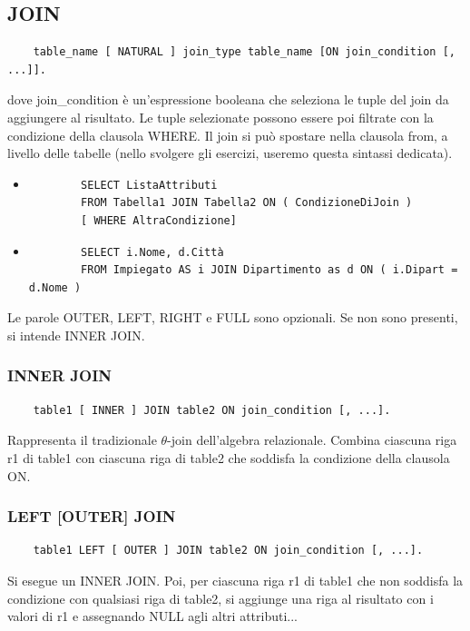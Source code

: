 \documentclass[a4paper]{article}
\begin{document}
\subsection{JOIN}

\begin{verbatim}
    table_name [ NATURAL ] join_type table_name [ON join_condition [, ...]].
\end{verbatim}
\noindent
dove join\_condition è un’espressione booleana che
seleziona le tuple del join da aggiungere al risultato. Le
tuple selezionate possono essere poi filtrate con la
condizione della clausola WHERE.
Il join si può spostare nella clausola from, a livello delle tabelle (nello
svolgere gli esercizi, useremo questa sintassi dedicata).

\begin{itemize}
    \item \begin{verbatim}
        SELECT ListaAttributi
        FROM Tabella1 JOIN Tabella2 ON ( CondizioneDiJoin )
        [ WHERE AltraCondizione]
    \end{verbatim}
    \item \begin{verbatim}
        SELECT i.Nome, d.Città
        FROM Impiegato AS i JOIN Dipartimento as d ON ( i.Dipart = d.Nome )
    \end{verbatim}
\end{itemize}
\noindent
Le parole OUTER, LEFT, RIGHT e FULL sono opzionali. Se non sono presenti, si intende INNER JOIN.

\subsubsection{INNER JOIN}

\begin{verbatim}
    table1 [ INNER ] JOIN table2 ON join_condition [, ...].
\end{verbatim}
\noindent
Rappresenta il tradizionale $\theta$-join dell’algebra relazionale.
Combina ciascuna riga r1 di table1 con ciascuna riga di
table2 che soddisfa la condizione della clausola ON.

\subsubsection{LEFT [OUTER] JOIN}

\begin{verbatim}
    table1 LEFT [ OUTER ] JOIN table2 ON join_condition [, ...].
\end{verbatim}
\noindent
Si esegue un INNER JOIN. Poi, per ciascuna riga r1 di
table1 che non soddisfa la condizione con qualsiasi
riga di table2, si aggiunge una riga al risultato con i
valori di r1 e assegnando NULL agli altri attributi...
\end{document}
